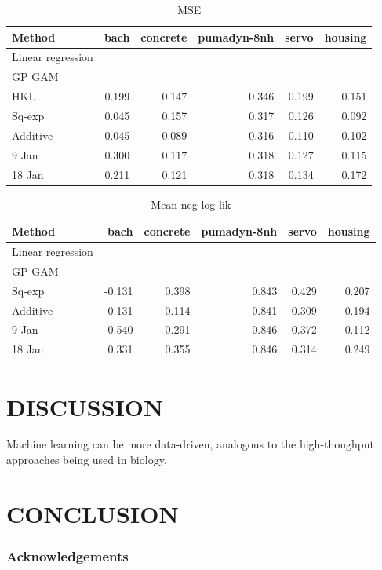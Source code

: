 \documentclass[twoside]{article}
\begin{document}
\begin{table}[h!]
\begin{center}
\begin{tabular}{l | r r r r r}
Method & bach & concrete & pumadyn-8nh & servo & housing \\
\hline
Linear regression & & & & & \\
GP GAM & & & & & \\
HKL & 0.199 & 0.147 & 0.346 & 0.199 & 0.151 \\
Sq-exp & 0.045 & 0.157 & 0.317 & 0.126 & 0.092 \\
Additive & 0.045 & 0.089 & 0.316 & 0.110 & 0.102 \\
\hline
9 Jan & 0.300 & 0.117 & 0.318 & 0.127 & 0.115 \\
18 Jan & 0.211 & 0.121 & 0.318 & 0.134 & 0.172\\
\end{tabular}
\caption{MSE}
\end{center}
\end{table}

\begin{table}[h!]
\begin{center}
\begin{tabular}{l | r r r r r}
Method & bach & concrete & pumadyn-8nh & servo & housing \\
\hline
Linear regression & & & & & \\
GP GAM & & & & & \\
Sq-exp & -0.131 & 0.398 & 0.843 & 0.429 & 0.207 \\
Additive & -0.131 & 0.114 & 0.841 & 0.309 & 0.194 \\
\hline
9 Jan & 0.540 & 0.291 & 0.846 & 0.372 & 0.112 \\
18 Jan & 0.331 & 0.355 & 0.846 & 0.314 & 0.249\\
\end{tabular}
\caption{Mean neg log lik}
\end{center}
\end{table}

\section{DISCUSSION}

Machine learning can be more data-driven, analogous to the high-thoughput approaches being used in biology. 


\section{CONCLUSION}


\subsubsection*{Acknowledgements}




\end{document}
